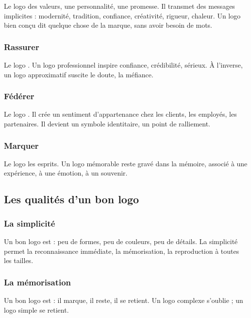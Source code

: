 Le logo  des valeurs, une personnalité, une promesse. Il transmet des messages implicites : modernité, tradition, confiance, créativité, rigueur, chaleur. Un logo bien conçu dit quelque chose de la marque, sans avoir besoin de mots.

\subsubsection{Rassurer}

Le logo . Un logo professionnel inspire confiance, crédibilité, sérieux. À l'inverse, un logo approximatif suscite le doute, la méfiance.

\subsubsection{Fédérer}

Le logo . Il crée un sentiment d'appartenance chez les clients, les employés, les partenaires. Il devient un symbole identitaire, un point de ralliement.

\subsubsection{Marquer}

Le logo  les esprits. Un logo mémorable reste gravé dans la mémoire, associé à une expérience, à une émotion, à un souvenir.

\subsection{Les qualités d'un bon logo}

\subsubsection{La simplicité}

Un bon logo est  : peu de formes, peu de couleurs, peu de détails. La simplicité permet la reconnaissance immédiate, la mémorisation, la reproduction à toutes les tailles.

\subsubsection{La mémorisation}

Un bon logo est  : il marque, il reste, il se retient. Un logo complexe s'oublie ; un logo simple se retient.

